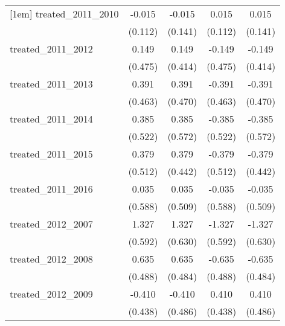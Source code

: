 {\begin{tabular}{l*{4}{c}}
[1em]
treated\_2011\_2010&      -0.015         &      -0.015         &       0.015         &       0.015         \\
            &     (0.112)         &     (0.141)         &     (0.112)         &     (0.141)         \\
[1em]
treated\_2011\_2012&       0.149         &       0.149         &      -0.149         &      -0.149         \\
            &     (0.475)         &     (0.414)         &     (0.475)         &     (0.414)         \\
[1em]
treated\_2011\_2013&       0.391         &       0.391         &      -0.391         &      -0.391         \\
            &     (0.463)         &     (0.470)         &     (0.463)         &     (0.470)         \\
[1em]
treated\_2011\_2014&       0.385         &       0.385         &      -0.385         &      -0.385         \\
            &     (0.522)         &     (0.572)         &     (0.522)         &     (0.572)         \\
[1em]
treated\_2011\_2015&       0.379         &       0.379         &      -0.379         &      -0.379         \\
            &     (0.512)         &     (0.442)         &     (0.512)         &     (0.442)         \\
[1em]
treated\_2011\_2016&       0.035         &       0.035         &      -0.035         &      -0.035         \\
            &     (0.588)         &     (0.509)         &     (0.588)         &     (0.509)         \\
[1em]
treated\_2012\_2007&       1.327\sym{*}  &       1.327\sym{*}  &      -1.327\sym{*}  &      -1.327\sym{*}  \\
            &     (0.592)         &     (0.630)         &     (0.592)         &     (0.630)         \\
[1em]
treated\_2012\_2008&       0.635         &       0.635         &      -0.635         &      -0.635         \\
            &     (0.488)         &     (0.484)         &     (0.488)         &     (0.484)         \\
[1em]
treated\_2012\_2009&      -0.410         &      -0.410         &       0.410         &       0.410         \\
            &     (0.438)         &     (0.486)         &     (0.438)         &     (0.486)         \\

\end{tabular}}
